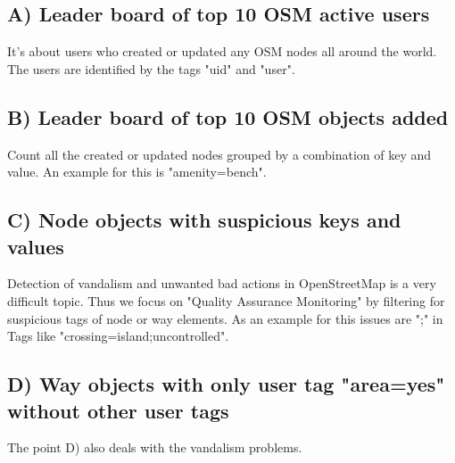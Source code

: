 \subsection{A) Leader board of top 10 OSM active users}
It's about users who created or updated any OSM nodes all around the world.
The users are identified by the tags "uid" and "user".

\subsection{B) Leader board of top 10 OSM objects added}
Count all the created or updated nodes grouped by a combination of key and value.
An example for this is "amenity=bench".

\subsection{C) Node objects with suspicious keys and values}
Detection of vandalism and unwanted bad actions in OpenStreetMap is a very difficult topic.
Thus we focus on "Quality Assurance Monitoring" by filtering for suspicious tags of node or way elements.
As an example for this issues are ";" in Tags like "crossing=island;uncontrolled".

\subsection{D) Way objects with only user tag "area=yes" without other user tags}
The point D) also deals with the vandalism problems.



